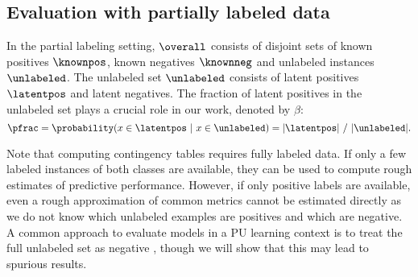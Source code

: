 


\subsection{Evaluation with partially labeled data}
In the partial labeling setting, $\overall$ consists of disjoint sets of known positives $\knownpos$, known negatives $\knownneg$ and unlabeled instances $\unlabeled$. %
The unlabeled set $\unlabeled$ consists of latent positives $\latentpos$ and latent negatives. The fraction of latent positives in the unlabeled set plays a crucial role in our work, denoted by $\beta$:
\begin{equation}
\pfrac = \probability(x \in \latentpos\ |\ x \in \unlabeled) = |\latentpos|\ /\ |\unlabeled|. \label{pfrac} %
\end{equation}

Note that computing contingency tables requires fully labeled data. If only a few labeled instances of both classes are available, they can be used to compute rough estimates of predictive performance. However, if only positive labels are available, even a rough approximation of common metrics cannot be estimated directly as we do not know which unlabeled examples are positives and which are negative. A common approach to evaluate models in a PU learning context is to treat the full unlabeled set as negative \citep{mordelet2011prodige,sifrim2013extasy,sechidis2014statistical}, though we will show that this may lead to spurious results. 

